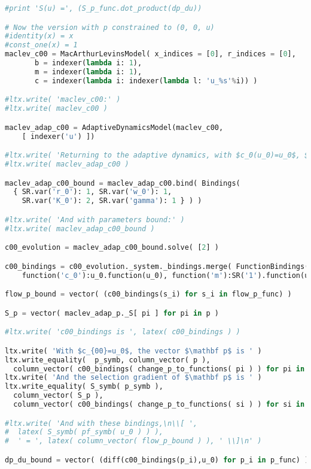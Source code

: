 \begin{lstlisting}[language=Python]
#print 'S(u) =', (S_p_func.dot_product(dp_du))

# Now the version with p constrained to (0, 0, u)
#identity(x) = x
#const_one(x) = 1
maclev_c00 = MacArthurLevinsModel( x_indices = [0], r_indices = [0],
       b = indexer(lambda i: 1),
       m = indexer(lambda i: 1),
       c = indexer(lambda i: indexer(lambda l: 'u_%s'%i)) )

#ltx.write( 'maclev_c00:' )
#ltx.write( maclev_c00 )

maclev_adap_c00 = AdaptiveDynamicsModel(maclev_c00, 
    [ indexer('u') ])

#ltx.write( 'Returning to the adaptive dynamics, with $c_0(u_0)=u_0$, $b(u_0) = m(u_0) = 1$:' )
#ltx.write( maclev_adap_c00 )

maclev_adap_c00_bound = maclev_adap_c00.bind( Bindings( 
  { SR.var('r_0'): 1, SR.var('w_0'): 1,
    SR.var('K_0'): 2, SR.var('gamma'): 1 } ) )

#ltx.write( 'And with parameters bound:' )
#ltx.write( maclev_adap_c00_bound )

c00_evolution = maclev_adap_c00_bound.solve( [2] )

c00_bindings = c00_evolution._system._bindings.merge( FunctionBindings( {
    function('c_0'):u_0.function(u_0), function('m'):SR('1').function(u_0), function('b'):SR('1').function(u_0) } ) )

flow_p_bound = vector( (c00_bindings(s_i) for s_i in flow_p_func) )

S_p = vector( maclev_adap_p._S[ pi ] for pi in p )

#ltx.write( 'c00_bindings is ', latex( c00_bindings ) )

ltx.write( 'With $c_{00}=u_0$, the vector $\mathbf p$ is ' )
ltx.write_equality(  p_symb, column_vector( p ),
  column_vector( c00_bindings( change_p_to_functions( pi ) ) for pi in p ) )
ltx.write( 'And the selection gradient of $\mathbf p$ is ' )
ltx.write_equality( S_symb( p_symb ),
  column_vector( S_p ),
  column_vector( c00_bindings( change_p_to_functions( si ) ) for si in S_p ) )

#ltx.write( 'And with these bindings,\n\\[ ',
#  latex( S_symb( pf_symb( u_0 ) ) ),
#  ' = ', latex( column_vector( flow_p_bound ) ), ' \\]\n' )

dp_du_bound = vector( (diff(c00_bindings(p_i),u_0) for p_i in p_func) )


\end{lstlisting}
